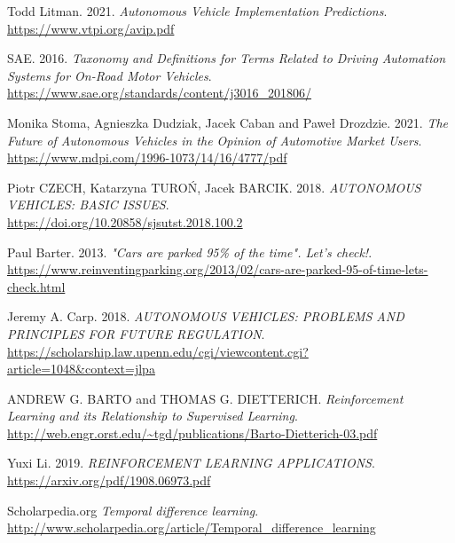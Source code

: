 \documentclass[14pt]{extarticle}
\begin{document}
\newpage
\begin{thebibliography}{999}

  Todd Litman. 2021.
  \emph{Autonomous Vehicle Implementation Predictions}.\\
  \url{https://www.vtpi.org/avip.pdf}
  
  SAE. 2016.
  \emph{Taxonomy and Definitions for Terms Related to Driving Automation Systems for On-Road Motor Vehicles}.\\
  \url{https://www.sae.org/standards/content/j3016_201806/}
   
  Monika Stoma, Agnieszka Dudziak, Jacek Caban and Paweł Drozdzie. 2021.
  \emph{The Future of Autonomous Vehicles in the Opinion of Automotive
Market Users}.\\
  \url{https://www.mdpi.com/1996-1073/14/16/4777/pdf}
   
  Piotr CZECH, Katarzyna TUROŃ, Jacek BARCIK. 2018.
  \emph{AUTONOMOUS VEHICLES: BASIC ISSUES}.\\
  \url{https://doi.org/10.20858/sjsutst.2018.100.2}
  
  Paul Barter. 2013.
  \emph{"Cars are parked 95\% of the time". Let's check!}.\\
  \url{https://www.reinventingparking.org/2013/02/cars-are-parked-95-of-time-lets-check.html}
  
  Jeremy A. Carp. 2018.
  \emph{AUTONOMOUS VEHICLES: PROBLEMS AND PRINCIPLES FOR FUTURE REGULATION}.\\
  \url{https://scholarship.law.upenn.edu/cgi/viewcontent.cgi?article=1048&context=jlpa}
 
  ANDREW G. BARTO and THOMAS G. DIETTERICH.
  \emph{Reinforcement Learning and its Relationship to Supervised Learning}.\\
  \url{http://web.engr.orst.edu/~tgd/publications/Barto-Dietterich-03.pdf}
  
  Yuxi Li. 2019.
  \emph{REINFORCEMENT LEARNING APPLICATIONS}.\\
  \url{https://arxiv.org/pdf/1908.06973.pdf}
  
  Scholarpedia.org
  \emph{Temporal difference learning}.\\
  \url{http://www.scholarpedia.org/article/Temporal_difference_learning}
  
  
   

\end{thebibliography}
\end{document}
